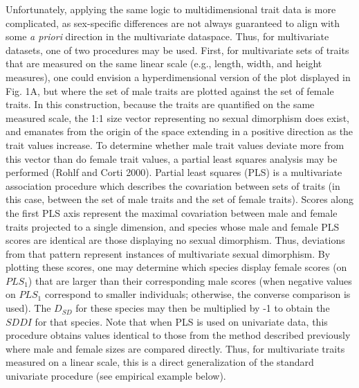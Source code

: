 \documentclass[]{article}
\begin{document}
Unfortunately, applying the same logic to multidimensional trait data is
more complicated, as sex-specific differences are not always guaranteed
to align with some \emph{a priori} direction in the multivariate
dataspace. Thus, for multivariate datasets, one of two procedures may be
used. First, for multivariate sets of traits that are measured on the
same linear scale (e.g., length, width, and height measures), one could
envision a hyperdimensional version of the plot displayed in Fig. 1A,
but where the set of male traits are plotted against the set of female
traits. In this construction, because the traits are quantified on the
same measured scale, the 1:1 size vector representing no sexual
dimorphism does exist, and emanates from the origin of the space
extending in a positive direction as the trait values increase. To
determine whether male trait values deviate more from this vector than
do female trait values, a partial least squares analysis may be
performed (Rohlf and Corti 2000). Partial least squares (PLS) is a
multivariate association procedure which describes the covariation
between sets of traits (in this case, between the set of male traits and
the set of female traits). Scores along the first PLS axis represent the
maximal covariation between male and female traits projected to a single
dimension, and species whose male and female PLS scores are identical
are those displaying no sexual dimorphism. Thus, deviations from that
pattern represent instances of multivariate sexual dimorphism. By
plotting these scores, one may determine which species display female
scores (on \(PLS_1\)) that are larger than their corresponding male
scores (when negative values on \(PLS_1\) correspond to smaller
individuals; otherwise, the converse comparison is used). The \(D_{SD}\)
for these species may then be multiplied by -1 to obtain the \(SDDI\)
for that species. Note that when PLS is used on univariate data, this
procedure obtains values identical to those from the method described
previously where male and female sizes are compared directly. Thus, for
multivariate traits measured on a linear scale, this is a direct
generalization of the standard univariate procedure (see empirical
example below). \hfill\break
\end{document}
